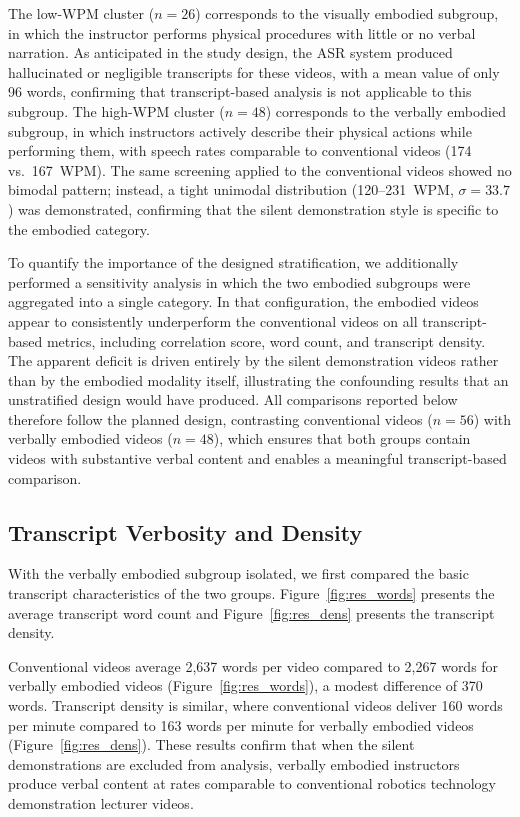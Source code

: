 \documentclass[fleqn,10pt]{JLA_article} %
\begin{document}
The low-WPM cluster ($n = 26$) corresponds to the visually embodied subgroup, in which the instructor performs physical procedures with little or no verbal narration. As anticipated in the study design, the ASR system produced hallucinated or negligible transcripts for these videos, with a mean value of only 96 words, confirming that transcript-based analysis is not applicable to this subgroup. The high-WPM cluster ($n = 48$) corresponds to the verbally embodied subgroup, in which instructors actively describe their physical actions while performing them, with speech rates comparable to conventional videos (174 vs.\ 167~WPM). The same screening applied to the conventional videos showed no bimodal pattern; instead, a tight unimodal distribution (120--231~WPM, $\sigma = 33.7$) was demonstrated, confirming that the silent demonstration style is specific to the embodied category.

To quantify the importance of the designed stratification, we additionally performed a sensitivity analysis in which the two embodied subgroups were aggregated into a single category. In that configuration, the embodied videos appear to consistently underperform the conventional videos on all transcript-based metrics, including correlation score, word count, and transcript density. The apparent deficit is driven entirely by the silent demonstration videos rather than by the embodied modality itself, illustrating the confounding results that an unstratified design would have produced. All comparisons reported below therefore follow the planned design, contrasting conventional videos ($n = 56$) with verbally embodied videos ($n = 48$), which ensures that both groups contain videos with substantive verbal content and enables a meaningful transcript-based comparison.

\subsection{Transcript Verbosity and Density}

With the verbally embodied subgroup isolated, we first compared the basic transcript characteristics of the two groups. Figure~\ref{fig:res_words} presents the average transcript word count and Figure~\ref{fig:res_dens} presents the transcript density.

Conventional videos average 2{,}637 words per video compared to 2{,}267 words for verbally embodied videos (Figure~\ref{fig:res_words}), a modest difference of 370 words. Transcript density is similar, where conventional videos deliver 160 words per minute compared to 163 words per minute for verbally embodied videos (Figure~\ref{fig:res_dens}). These results confirm that when the silent demonstrations are excluded from analysis, verbally embodied instructors produce verbal content at rates comparable to conventional robotics technology demonstration lecturer videos.
\end{document}
